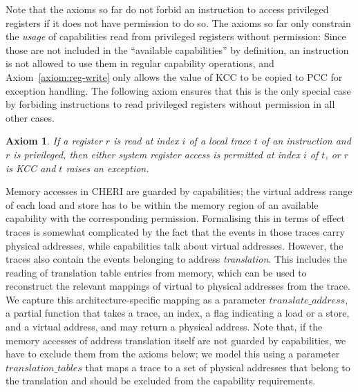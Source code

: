 \documentclass[11pt]{article}
\newtheorem{axiom}{Axiom}
\theoremstyle{definition}
\begin{document}
Note that the axioms so far do not forbid an instruction to access privileged
registers if it does not have permission to do so.  The axioms so far only
constrain the \emph{usage} of capabilities read from privileged registers
without permission:  Since those are not included in the ``available
capabilities'' by definition, an instruction is not allowed to use them
in regular capability operations, and Axiom~\ref{axiom:reg-write} only
allows the value of KCC to be copied to PCC for exception handling.
The following axiom ensures that this is the only special case by
forbiding instructions to read privileged registers without permission
in all other cases.

\begin{axiom}
	If a register $r$ is read at index $i$ of a local trace $t$ of an instruction and $r$ is privileged,
	then either system register access is permitted at index $i$ of $t$, or
	$r$ is KCC and $t$ raises an exception.
\end{axiom}

Memory accesses in CHERI are guarded by capabilities; the virtual address range
of each load and store has to be within the memory region of an available
capability with the corresponding permission.  Formalising this in terms of
effect traces is somewhat complicated by the fact that the events in those
traces carry physical addresses, while capabilities talk about virtual
addresses.  However, the traces also contain the events belonging to
address \emph{translation}.  This includes the reading of translation table entries from memory, which can be used to reconstruct the relevant
mappings of virtual to physical addresses from the trace.  We capture this
architecture-specific mapping as a parameter $\mathit{translate\_address}$, a
partial function that takes a trace, an index, a flag indicating a load or a store,
and a virtual address, and may return a physical address.
Note that, if the memory accesses of address translation itself are not guarded by capabilities, %
we have to exclude them from the axioms below; we model this using a parameter
$\mathit{translation\_tables}$ that maps a trace to a set of physical addresses that belong
to the translation and should be excluded from the capability requirements.
\end{document}
